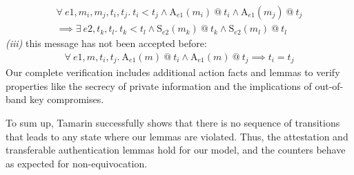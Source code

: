 {\begin{equation}
\begin{split}
        \forall~e1, \textit{m}_i, \textit{m}_j, t_i, t_j.~t_i < t_j \land \text{A}_{e1}(\textit{m}_i) ~@~ t_i \land \text{A}_{e1}(\textit{m}_j) ~@~ t_j \\
        \implies \exists~e2, t_k, t_l.~ t_k < t_l \land \text{S}_{e2}(\textit{m}_k) ~@~ t_k \land \text{S}_{e2}(\textit{m}_l) ~@~ t_l
        \end{split}
    \end{equation}
    \emph{(iii)} this message has not been accepted before:
    \begin{equation}
        \begin{split}
               \forall~e1, \textit{m}, t_i, t_j.~\text{A}_{e1}(\textit{m}) ~@~ t_i \land \text{A}_{e1}(\textit{m}) ~@~ t_j \implies t_i = t_j
        \end{split}
    \end{equation}
    Our complete verification includes additional action facts and lemmas to verify properties like the secrecy of private information and the implications of out-of-band key compromises.
}

To sum up, Tamarin successfully shows that there is no sequence of transitions that leads to any state where our lemmas are violated. Thus, the attestation and transferable authentication lemmas hold for our model, and the counters behave as expected for non-equivocation. 

\endgroup